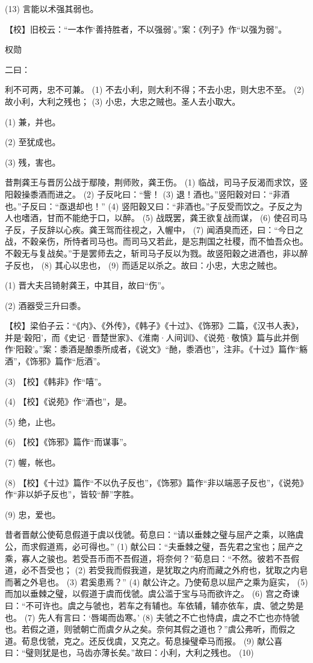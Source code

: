 \documentclass[12pt,UTF8]{ctexbook}
\begin{document}
(13) 言能以术强其弱也。

【校】旧校云：“一本作‘善持胜者，不以强弱’。”案：《列子》作“以强为弱”。





权勋


二曰：

利不可两，忠不可兼。 (1) 不去小利，则大利不得；不去小忠，则大忠不至。 (2) 故小利，大利之残也； (3) 小忠，大忠之贼也。圣人去小取大。

(1) 兼，并也。

(2) 至犹成也。

(3) 残，害也。

昔荆龚王与晋厉公战于鄢陵，荆师败，龚王伤。 (1) 临战，司马子反渴而求饮，竖阳穀操黍酒而进之。 (2) 子反叱曰：“訾！ (3) 退！酒也。”竖阳穀对曰：“非酒也。”子反曰：“亟退却也！” (4) 竖阳穀又曰：“非酒也。”子反受而饮之。子反之为人也嗜酒，甘而不能绝于口，以醉。 (5) 战既罢，龚王欲复战而谋， (6) 使召司马子反，子反辞以心疾。龚王驾而往视之，入幄中， (7) 闻酒臭而还，曰：“今日之战，不穀亲伤，所恃者司马也。而司马又若此，是忘荆国之社稷，而不恤吾众也。不穀无与复战矣。”于是罢师去之，斩司马子反以为戮。故竖阳穀之进酒也，非以醉子反也， (8) 其心以忠也， (9) 而适足以杀之。故曰：小忠，大忠之贼也。

(1) 晋大夫吕锜射龚王，中其目，故曰“伤”。

(2) 酒器受三升曰黍。

【校】梁伯子云：“《内》、《外传》，《韩子》《十过》、《饰邪》二篇，《汉书人表》，并是‘穀阳’，而《史记·晋楚世家》、《淮南·人间训》、《说苑·敬慎》篇与此并倒作‘阳穀’。”案：黍酒是酿黍所成者，《说文》“酏，黍酒也”，注非。《十过》篇作“觞酒”，《饰邪》篇作“卮酒”。

(3) 【校】《韩非》作“嘻”。

(4) 【校】《说苑》作“酒也”，是。

(5) 绝，止也。

(6) 【校】《饰邪》篇作“而谋事”。

(7) 幄，帐也。

(8) 【校】《十过》篇作“不以仇子反也”，《饰邪》篇作“非以端恶子反也”，《说苑》作“非以妒子反也”，皆较“醉”字胜。

(9) 忠，爱也。

昔者晋献公使荀息假道于虞以伐虢。荀息曰：“请以垂棘之璧与屈产之乘，以赂虞公，而求假道焉，必可得也。” (1) 献公曰：“夫垂棘之璧，吾先君之宝也；屈产之乘，寡人之骏也。若受吾币而不吾假道，将奈何？”荀息曰：“不然。彼若不吾假道，必不吾受也； (2) 若受我而假我道，是犹取之内府而藏之外府也，犹取之内皂而著之外皂也。 (3) 君奚患焉？” (4) 献公许之。乃使荀息以屈产之乘为庭实， (5) 而加以垂棘之璧，以假道于虞而伐虢。虞公滥于宝与马而欲许之。 (6) 宫之奇谏曰：“不可许也。虞之与虢也，若车之有辅也。车依辅，辅亦依车，虞、虢之势是也。 (7) 先人有言曰：‘唇竭而齿寒。’ (8) 夫虢之不亡也恃虞，虞之不亡也亦恃虢也。若假之道，则虢朝亡而虞夕从之矣。奈何其假之道也？”虞公弗听，而假之道。荀息伐虢，克之。还反伐虞，又克之。荀息操璧牵马而报。 (9) 献公喜曰：“璧则犹是也，马齿亦薄长矣。”故曰：小利，大利之残也。 (10)
\end{document}
